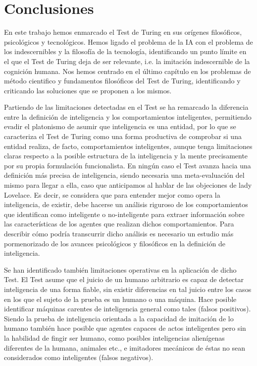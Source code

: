 \documentclass[12pt]{memoir}
\begin{document}
\chapter{Conclusiones}

En este trabajo hemos enmarcado el Test de Turing en sus orígenes filosóficos, psicológicos y tecnológicos. Hemos ligado el problema de la IA con el problema de los indescernibles y la filosofía de la tecnología, identificando un punto límite en el que el Test de Turing deja de ser relevante, i.e. la imitación indescernible de la cognición humana. Nos hemos centrado en el último capítulo en los problemas de método cientifico y fundamentos filosóficos del Test de Turing, identificando y criticando las soluciones que se proponen a los mismos.

Partiendo de las limitaciones detectadas en el Test se ha remarcado la diferencia entre la definición de inteligencia y los comportamientos inteligentes, permitiendo evadir el platonismo de asumir que inteligencia es una entidad, por lo que se caracteriza el Test de Turing como una forma productiva de comprobar si una entidad realiza, de facto, comportamientos inteligentes, aunque tenga limitaciones claras respecto a la posible estructura de la inteligencia y la mente precisamente por su propia formulación funcionalista. En ningún caso el Test avanza hacia una definición más precisa de inteligencia, siendo necesaria una meta-evaluación del mismo para llegar a ella, caso que anticipamos al hablar de las objeciones de lady Lovelace. Es decir, se considera que para entender mejor como opera la inteligencia, de existir, debe hacerse un análisis riguroso de los comportamientos que identifican como inteligente o no-inteligente para extraer información sobre las características de los agentes que realizan dichos comportamientos. Para describir cómo podría transcurrir dicho análisis es necesario un estudio más pormenorizado de los avances psicológicos y filosóficos en la definición de inteligencia.

Se han identificado también limitaciones operativas en la aplicación de dicho Test. El Test asume que el juicio de un humano arbitrario es capaz de detectar inteligencia de una forma fiable, sin existir diferencias en tal juicio entre los casos en los que el sujeto de la prueba es un humano o una máquina. Hace posible identificar máquinas carentes de inteligencia general como tales (falsos positivos). Siendo la prueba de inteligencia orientada a la capacidad de imitación de lo humano también hace posible que agentes capaces de actos inteligentes pero sin la habilidad de fingir ser humano, como posibles inteligencias alienígenas diferentes de la humana, animales etc., e imitadores mecánicos de éstas no sean considerados como inteligentes (falsos negativos).
\end{document}
